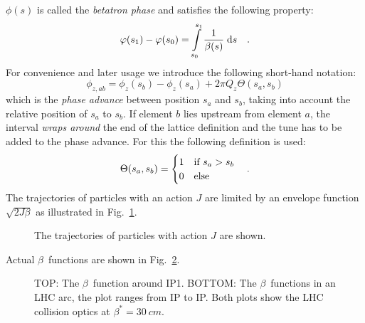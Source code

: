 $\phi(s)$ is called the \emph{betatron phase} and satisfies the following property:
%
\begin{equation}
    \varphi(s_1) - \varphi(s_0) = \int\limits_{s_0}^{s_1} \frac{1}{\beta(s)}\;\text{d} s
    \quad .
    \label{eq_phase}
\end{equation}
%
For convenience and later usage we introduce the following short-hand notation:
%
\begin{equation}
    \phi_{z,ab} = \phi_z(s_b) - \phi_z(s_a) + 2\pi Q_z \Theta(s_a, s_b)
\end{equation}
%
which is the \emph{phase advance} between position $s_a$ and $s_b$, taking into
account the relative position of $s_a$ to $s_b$.
If element $b$ lies upstream from element $a$, the interval \emph{wraps around} the end of the
lattice definition and the tune
has to be added to the phase advance. For this the following definition is used:
%
\begin{equation}
    \Theta(s_a, s_b) =
    \begin{cases}
        1 & \text{if } s_a > s_b \\
        0 & \text{else} \\
    \end{cases}
    \quad .
\end{equation}
%
The trajectories of particles with an action $J$ are limited by an envelope function $\sqrt{2J\beta}$ as illustrated in Fig.~\ref{fig_part_traj}.
%
\begin{figure}[h]
    \centering
    
    \hfill
     
    \caption{The trajectories of particles with action $J$ are shown.}
    \label{fig_part_traj}
\end{figure}
%
Actual $\beta$~functions are shown in Fig.~\ref{fig_beta}.
%
\begin{figure}[h]
  \centering
  \footnotesize
  
  
  \normalsize
  \caption{
    TOP: The $\beta$~function around IP1.
    BOTTOM: The $\beta$~functions in an LHC arc, the plot ranges from IP to IP.
    Both plots show the LHC collision optics at $\beta^*=\SI{30}{cm}$.
  }
  \label{fig_beta}
\end{figure}

